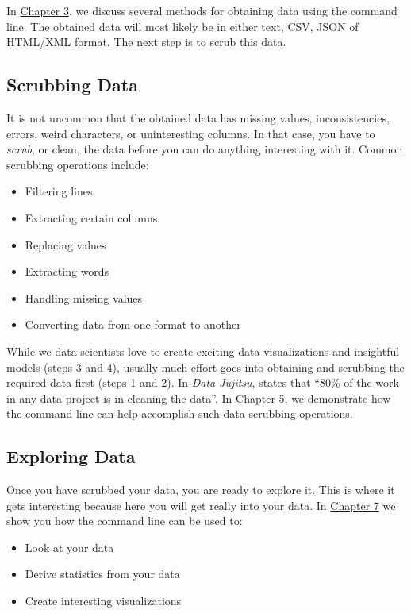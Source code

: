 \documentclass[
]{book}
\providecommand{\tightlist}{%
  \setlength{\itemsep}{0pt}\setlength{\parskip}{0pt}}
\theoremstyle{definition}
\theoremstyle{definition}
\theoremstyle{definition}
\theoremstyle{remark}
\begin{document}
In \protect\hyperlink{chapter-3-obtaining-data}{Chapter 3}, we discuss several methods for obtaining data using the command line. The obtained data will most likely be in either text, CSV, JSON of HTML/XML format. The next step is to scrub this data.

\hypertarget{scrubbing-data}{%
\subsection{Scrubbing Data}\label{scrubbing-data}}

It is not uncommon that the obtained data has missing values, inconsistencies, errors, weird characters, or uninteresting columns. In that case, you have to \emph{scrub}, or clean, the data before you can do anything interesting with it. Common scrubbing operations include:

\begin{itemize}
\tightlist
\item
  Filtering lines
\item
  Extracting certain columns
\item
  Replacing values
\item
  Extracting words
\item
  Handling missing values
\item
  Converting data from one format to another
\end{itemize}

While we data scientists love to create exciting data visualizations and insightful models (steps 3 and 4), usually much effort goes into obtaining and scrubbing the required data first (steps 1 and 2). In \emph{Data Jujitsu}, \citet{Patil2012} states that ``80\% of the work in any data project is in cleaning the data''. In \protect\hyperlink{chapter-5-scrubbing-data}{Chapter 5}, we demonstrate how the command line can help accomplish such data scrubbing operations.

\hypertarget{exploring-data}{%
\subsection{Exploring Data}\label{exploring-data}}

Once you have scrubbed your data, you are ready to explore it. This is where it gets interesting because here you will get really into your data. In \protect\hyperlink{chapter-7-exploring-data}{Chapter 7} we show you how the command line can be used to:

\begin{itemize}
\tightlist
\item
  Look at your data
\item
  Derive statistics from your data
\item
  Create interesting visualizations
\end{itemize}
\end{document}
